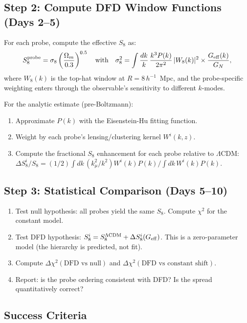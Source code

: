 \documentclass[11pt]{article}
\newcommand{\LCDM}{\Lambda\text{CDM}}
\newcommand{\Geff}{G_{\rm eff}}
\begin{document}
\subsection{Step 2: Compute DFD Window Functions (Days 2--5)}

For each probe, compute the effective $S_8$ as:
\begin{equation}
S_8^{\rm probe} = \sigma_8 \left(\frac{\Omega_m}{0.3}\right)^{0.5}
\quad\text{with}\quad
\sigma_8^2 = \int \frac{dk}{k}\,\frac{k^3 P(k)}{2\pi^2}\,
|W_8(k)|^2 \times \frac{\Geff(k)}{G_N},
\end{equation}
where $W_8(k)$ is the top-hat window at $R = 8\,h^{-1}$~Mpc, and the
probe-specific weighting enters through the observable's sensitivity
to different $k$-modes.

For the analytic estimate (pre-Boltzmann):
\begin{enumerate}[label=\textbf{2.\arabic*:}, nosep]
\item Approximate $P(k)$ with the Eisenstein-Hu fitting function.
\item Weight by each probe's lensing/clustering kernel $W^i(k,z)$.
\item Compute the fractional $S_8$ enhancement for each probe
  relative to $\LCDM$: $\Delta S_8^i / S_8 = (1/2)\int dk\,
  (k_\mu^2/k^2) W^i(k) P(k) / \int dk\,W^i(k) P(k)$.
\end{enumerate}

\subsection{Step 3: Statistical Comparison (Days 5--10)}

\begin{enumerate}[label=\textbf{3.\arabic*:}, nosep]
\item Test null hypothesis: all probes yield the same $S_8$.
  Compute $\chi^2$ for the constant model.
\item Test DFD hypothesis: $S_8^i = S_8^{\LCDM} + \Delta S_8^i(\Geff)$.
  This is a zero-parameter model (the hierarchy is predicted, not fit).
\item Compute $\Delta\chi^2(\text{DFD vs null})$ and
  $\Delta\chi^2(\text{DFD vs constant shift})$.
\item Report: is the probe ordering consistent with DFD?
  Is the spread quantitatively correct?
\end{enumerate}

\subsection{Success Criteria}
\end{document}
